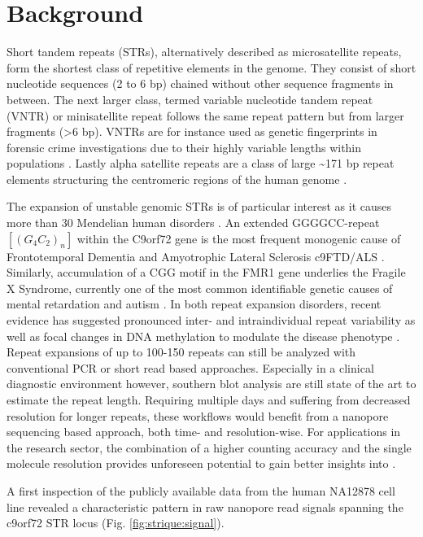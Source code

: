 \section{Background}
\label{sec:strique:background}

Short tandem repeats (STRs), alternatively described as microsatellite repeats, form the shortest class of repetitive elements in the genome. They consist of short nucleotide sequences (2 to 6 bp) chained without other sequence fragments in between. The next larger class, termed variable nucleotide tandem repeat (VNTR) or minisatellite repeat follows the same repeat pattern but from larger fragments (>6 bp). VNTRs are for instance used as genetic fingerprints in forensic crime investigations due to their highly variable lengths within populations \cite{Marwal2014}. Lastly alpha satellite repeats are a class of large {\textasciitilde171 bp} repeat elements structuring the centromeric regions of the human genome \cite{McNulty2018}. 

The expansion of unstable genomic STRs is of particular interest as it causes more than 30 Mendelian human disorders \cite{Gatchel2005}. An extended GGGGCC-repeat $ [(G_{4}C_{2})_{n}] $ within the C9orf72 gene is the most frequent monogenic cause of Frontotemporal Dementia and Amyotrophic Lateral Sclerosis c9FTD/ALS \cite{Paulson2018}. Similarly, accumulation of a CGG motif in the FMR1 gene underlies the Fragile X Syndrome, currently one of the most common identifiable genetic causes of mental retardation and autism \cite{Verkerk1991}. In both repeat expansion disorders, recent evidence has suggested pronounced inter- and intraindividual repeat variability as well as focal changes in DNA methylation to modulate the disease phenotype \cite{Blitterswijk2013, Xi2013, Russ2015}. Repeat expansions of up to 100-150 repeats can still be analyzed with conventional PCR or short read based approaches. Especially in a clinical diagnostic environment however, southern blot analysis are still state of the art to estimate the repeat length. Requiring multiple days and suffering from decreased resolution for longer repeats, these workflows would benefit from a nanopore sequencing based approach, both time- and resolution-wise. For applications in the research sector, the combination of a higher counting accuracy and the single molecule resolution provides unforeseen potential to gain better insights into .

A first inspection of the publicly available data from the human NA12878 cell line revealed a characteristic pattern in raw nanopore read signals spanning the c9orf72 STR locus (Fig. \ref{fig:strique:signal}).

